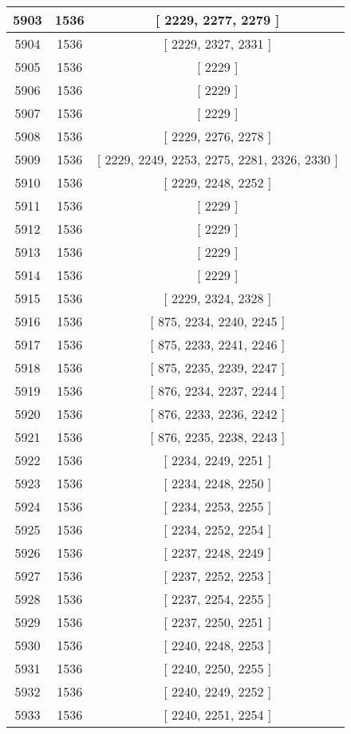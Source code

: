 \begin{center}
\begin{longtable}[H]{|| c c c ||}
\hline
5903 & 1536 & [ 2229, 2277, 2279 ] \\ 
\hline
5904 & 1536 & [ 2229, 2327, 2331 ] \\ 
\hline
5905 & 1536 & [ 2229 ] \\ 
\hline
5906 & 1536 & [ 2229 ] \\ 
\hline
5907 & 1536 & [ 2229 ] \\ 
\hline
5908 & 1536 & [ 2229, 2276, 2278 ] \\ 
\hline
5909 & 1536 & [ 2229, 2249, 2253, 2275, 2281, 2326, 2330 ] \\ 
\hline
5910 & 1536 & [ 2229, 2248, 2252 ] \\ 
\hline
5911 & 1536 & [ 2229 ] \\ 
\hline
5912 & 1536 & [ 2229 ] \\ 
\hline
5913 & 1536 & [ 2229 ] \\ 
\hline
5914 & 1536 & [ 2229 ] \\ 
\hline
5915 & 1536 & [ 2229, 2324, 2328 ] \\ 
\hline
5916 & 1536 & [ 875, 2234, 2240, 2245 ] \\ 
\hline
5917 & 1536 & [ 875, 2233, 2241, 2246 ] \\ 
\hline
5918 & 1536 & [ 875, 2235, 2239, 2247 ] \\ 
\hline
5919 & 1536 & [ 876, 2234, 2237, 2244 ] \\ 
\hline
5920 & 1536 & [ 876, 2233, 2236, 2242 ] \\ 
\hline
5921 & 1536 & [ 876, 2235, 2238, 2243 ] \\ 
\hline
5922 & 1536 & [ 2234, 2249, 2251 ] \\ 
\hline
5923 & 1536 & [ 2234, 2248, 2250 ] \\ 
\hline
5924 & 1536 & [ 2234, 2253, 2255 ] \\ 
\hline
5925 & 1536 & [ 2234, 2252, 2254 ] \\ 
\hline
5926 & 1536 & [ 2237, 2248, 2249 ] \\ 
\hline
5927 & 1536 & [ 2237, 2252, 2253 ] \\ 
\hline
5928 & 1536 & [ 2237, 2254, 2255 ] \\ 
\hline
5929 & 1536 & [ 2237, 2250, 2251 ] \\ 
\hline
5930 & 1536 & [ 2240, 2248, 2253 ] \\ 
\hline
5931 & 1536 & [ 2240, 2250, 2255 ] \\ 
\hline
5932 & 1536 & [ 2240, 2249, 2252 ] \\ 
\hline
5933 & 1536 & [ 2240, 2251, 2254 ] \\ 

\end{longtable}
\end{center}
